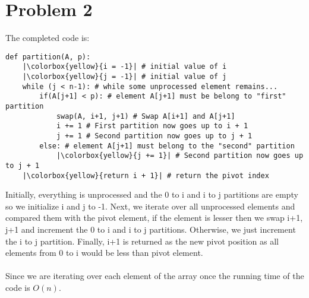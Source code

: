 \documentclass[12pt]{article}
\begin{document}
\section*{Problem 2}
The completed code is:
\begin{verbatim}
def partition(A, p):
    |\colorbox{yellow}{i = -1}| # initial value of i
    |\colorbox{yellow}{j = -1}| # initial value of j
    while (j < n-1): # while some unprocessed element remains...
        if(A[j+1] < p): # element A[j+1] must be belong to "first" partition
            swap(A, i+1, j+1) # Swap A[i+1] and A[j+1]
            i += 1 # First partition now goes up to i + 1
            j += 1 # Second partition now goes up to j + 1
        else: # element A[j+1] must belong to the "second" partition
            |\colorbox{yellow}{j += 1}| # Second partition now goes up to j + 1
    |\colorbox{yellow}{return i + 1}| # return the pivot index
\end{verbatim}

Initially, everything is unprocessed and the 0 to i and i to j partitions are empty so we initialize i and j to -1. Next, we iterate over all unprocessed elements and compared them with the pivot element, if the element is lesser then we swap i+1, j+1 and increment the 0 to i and i to j partitions. Otherwise, we just increment the i to j partition. Finally, i+1 is returned as the new pivot position as all elements from 0 to i would be less than pivot element. \\~\\
Since we are iterating over each element of the array once the running time of the code is \(O(n)\).
\end{document}
